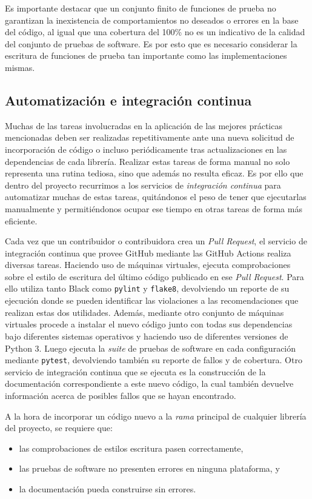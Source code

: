 Es importante destacar que un conjunto finito de funciones de prueba no
garantizan la inexistencia de comportamientos no deseados o errores en la base
del código, al igual que una cobertura del 100\% no es un indicativo de la
calidad del conjunto de pruebas de software.
Es por esto que es necesario considerar la escritura de funciones de prueba tan
importante como las implementaciones mismas.


\subsection{Automatización e integración continua}
\label{sec:ci}

Muchas de las tareas involucradas en la aplicación de las mejores prácticas
mencionadas deben ser realizadas repetitivamente ante una nueva solicitud de
incorporación de código o incluso periódicamente tras actualizaciones en las
dependencias de cada librería.
Realizar estas tareas de forma manual no solo representa una rutina tediosa,
sino que además no resulta eficaz.
Es por ello que dentro del proyecto recurrimos a los servicios de
\emph{integración continua} para automatizar muchas de estas tareas,
quitándonos el peso de tener que ejecutarlas manualmente y permitiéndonos
ocupar ese tiempo en otras tareas de forma más eficiente.

Cada vez que un contribuidor o contribuidora crea un \emph{Pull Request}, el
servicio de integración continua que provee GitHub mediante las GitHub Actions
realiza diversas tareas.
Haciendo uso de máquinas virtuales, ejecuta comprobaciones sobre el estilo de
escritura del último código publicado en ese \emph{Pull Request}.
Para ello utiliza tanto Black como \texttt{pylint} y \texttt{flake8},
devolviendo un reporte de su ejecución donde se pueden identificar las
violaciones a las recomendaciones que realizan estas dos utilidades.
Además, mediante otro conjunto de máquinas virtuales procede a instalar el
nuevo código junto con todas sus dependencias bajo diferentes sistemas
operativos y haciendo uso de diferentes versiones de Python 3.
Luego ejecuta la \emph{suite} de pruebas de software en cada configuración
mediante \texttt{pytest}, devolviendo también su reporte de fallos y de
cobertura.
Otro servicio de integración continua que se ejecuta es la construcción de la
documentación correspondiente a este nuevo código, la cual también devuelve
información acerca de posibles fallos que se hayan encontrado.

A la hora de incorporar un código nuevo a la \emph{rama} principal de cualquier
librería del proyecto, se requiere que:
%
\begin{itemize}
    \item las comprobaciones de estilos escritura pasen correctamente,
    \item las pruebas de software no presenten errores en ninguna plataforma, y
    \item la documentación pueda construirse sin errores.
\end{itemize}

